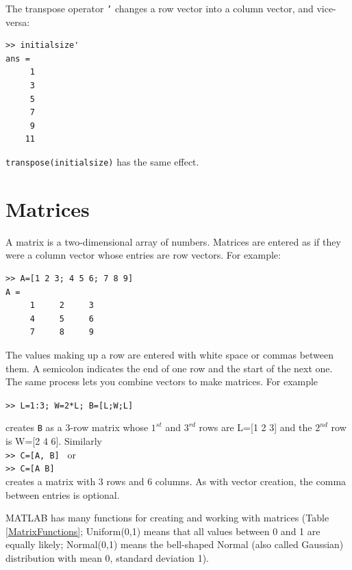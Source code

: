 \documentclass [11pt]{article}
\newcommand{\ttt}[1]{\texttt{#1}}
\newcommand{\tab}{\hspace*{0.5in}}
\numberwithin{exercise}{section}
\begin{document}
The transpose operator \ttt{'} changes a row vector into a column vector, and vice-versa: 

\begin{verbatim}
>> initialsize'
ans =
     1
     3
     5
     7
     9
    11
\end{verbatim}

\texttt{transpose(initialsize)} has the same effect. 

\section{Matrices}
\vspace{-0.15in} 
A matrix is a two-dimensional array of numbers. Matrices are 
entered as if they were a column vector whose entries are row 
vectors. For example:
\begin{verbatim}
>> A=[1 2 3; 4 5 6; 7 8 9]
A =
     1     2     3
     4     5     6
     7     8     9
\end{verbatim}
The values making up a row are entered with white space or commas between 
them. A semicolon indicates the end of one row and the start of the next 
one. The same process lets you combine vectors to make matrices. For example 

\tab \texttt{>> L=1:3; W=2*L; B=[L;W;L]} 

creates \ttt{B} as a 3-row matrix whose $1^{st}$ and $3^{rd}$ rows are L=[1 2 3] and the 
$2^{nd}$ row is W=[2 4 6]. Similarly \\
\tab \texttt{>> C=[A, B] } or \\
\tab \texttt{>> C=[A B] } \\
creates a matrix with 3 rows and 6 columns. As with vector creation, 
the comma between entries is optional. 

MATLAB has many functions for creating and working
with matrices (Table \ref{MatrixFunctions}; 
Uniform(0,1) means that all values between 0 and 1 are equally 
likely; Normal(0,1) means the bell-shaped Normal (also called Gaussian) 
distribution with mean 0, standard deviation 1). 
\end{document}
